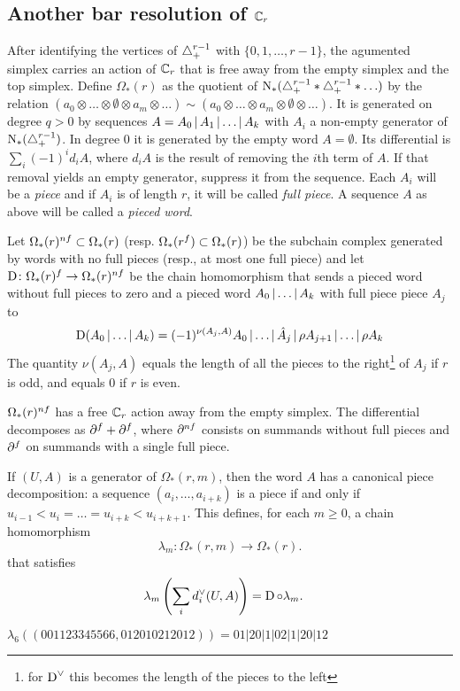 \subsection{Another bar resolution of $\mathbb{C}_r$}  After identifying the vertices of $\triangle_{+}^{r-1}$ with $\{0,1,\ldots,r-1\}$, the agumented simplex carries an action of $\mathbb{C}_r$ that is free away from the empty simplex and the top simplex. Define $\Omega_*(r)$ as the quotient of $\operatorname{N}_*(\triangle_{+}^{r-1}*\triangle_{+}^{r-1}*\ldots)$ by the relation $(a_0\otimes \ldots \otimes \emptyset \otimes a_m\otimes \ldots) \sim (a_0\otimes \ldots \otimes a_m \otimes \emptyset \otimes \ldots)$. It is generated on degree $q>0$ by sequences $A = A_0\operatorname{|} A_1\operatorname{|}\ldots \operatorname{|} A_k$ with $A_i$ a non-empty generator of $\operatorname{N}_*(\triangle_{+}^{r-1})$. In degree $0$ it is generated by the empty word $A=\emptyset$. Its differential is $\sum_{i} (-1)^i d_i A$, where $d_iA$ is the result of removing the $i$th term of $A$. If that removal yields an empty generator, suppress it from the sequence. Each $A_i$ will be a \emph{piece} and if $A_i$ is of length $r$, it will be called \emph{full piece}. A sequence $A$ as above will be called a \emph{pieced word}. 



Let $\Omega_*(r)^{nf}\subset \Omega_*(r)$ (resp. $\Omega_*(r^{f})\subset \Omega_*(r)$) be the subchain complex generated by words with no full pieces (resp., at most one full piece) and let $\operatorname{D}\colon \Omega_*(r)^{f}\to \Omega_*(r)^{nf}$ be the chain homomorphism that sends a pieced word  without full pieces to zero and a pieced word $A_0\operatorname{|}\ldots\operatorname{|} A_k$ with full piece piece $A_j$ to 
\[
    \operatorname{D}(A_0\operatorname{|} \ldots\operatorname{|} A_k) = (-1)^{\nu(A_{j},A)}A_0\operatorname{|} \ldots\operatorname{|} \hat{A}_{j}\operatorname{|} \rho A_{j+1}\operatorname{|} \ldots\operatorname{|} \rho A_k
\]
The quantity $\nu(A_j,A)$ equals the length of all the pieces to the right\footnote{for $\operatorname{D}^\vee$ this becomes the length of the pieces to the left} of $A_j$ if $r$ is odd, and equals $0$ if $r$ is even.

$\Omega_*(r)^{nf}$ has a free $\mathbb{C}_r$ action away from the empty simplex. The differential decomposes as $\partial^{f}+\partial^{f}$, where $\partial^{nf}$ consists on summands without full pieces and $\partial^{f}$ on summands with a single full piece.

If $(U,A)$ is a generator of $\Omega_*(r,m)$, then the word $A$ has a canonical piece decomposition: a sequence $(a_i,\ldots,a_{i+k})$ is a piece if and only if $u_{i-1}<u_i =\ldots= u_{i+k}<u_{i+k+1}$. This defines, for each $m\geq 0$, a chain homomorphism
\[\lambda_m\colon \Omega_*(r,m)\to \Omega_*(r).\]
that satisfies
\begin{align*}
     \lambda_m\left(\sum_i d_i^\vee(U,A)\right) &= \operatorname{D}\circ \lambda_m.
\end{align*}
%
\begin{example}\label{ex:106}
    $\lambda_6((001123345566,012010212012)) = 01|20|1|02|1|20|12$
\end{example}

